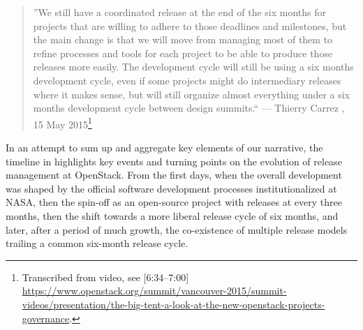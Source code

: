 \documentclass[dvipsnames]{interact}
\theoremstyle{plain}\newtheorem{theorem}{Theorem}[section]
\theoremstyle{definition}
\theoremstyle{remark}
\begin{document}
\begin{quotation} 
\footnotesize
 ''We still have a coordinated release at the end of the six months for projects that are willing to adhere to those deadlines and milestones, but the main change is that we will move from managing most of them to refine processes and tools for each project to be able to produce those releases more easily. The development cycle will still be using a six months development cycle, even if some projects might do intermediary releases where it makes sense, but will still organize almost everything under a six months development cycle between design summits.`` --- Thierry Carrez , 15 May 2015\footnote{Transcribed from video, see [6:34--7:00] \url{https://www.openstack.org/summit/vancouver-2015/summit-videos/presentation/the-big-tent-a-look-at-the-new-openstack-projects-governance}.}
\end{quotation}



In an attempt to sum up and aggregate key elements of our narrative,  the timeline in  highlights key events and turning points on the evolution of release management at OpenStack. From the first days, when the overall development was shaped by the official software development processes institutionalized  at NASA, then the spin-off as an open-source project with releases at every three months,  then the shift towards a more liberal release cycle of six months, and later,  after a period of much growth, the co-existence of multiple release models trailing a common six-month release cycle. 
\end{document}
